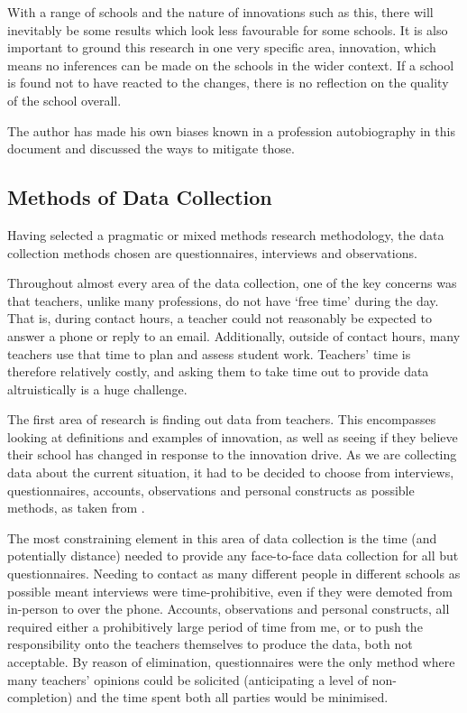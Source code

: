 \documentclass[11pt]{article}
\begin{document}
With a range of schools and the nature of innovations such as this, there will inevitably be some results which look less favourable for some schools. It is also important to ground this research in one very specific area, innovation, which means no inferences can be made on the schools in the wider context. If a school is found not to have reacted to the changes, there is no reflection on the quality of the school overall.

The author has made his own biases known in a profession autobiography in this document and discussed the ways to mitigate those.

\subsection{Methods of Data Collection}
Having selected a pragmatic or mixed methods research methodology, the data collection methods chosen are questionnaires, interviews and observations.

Throughout almost every area of the data collection, one of the key concerns was that teachers, unlike many professions, do not have `free time' during the day. That is, during contact hours, a teacher could not reasonably be expected to answer a phone or reply to an email. Additionally, outside of contact hours, many teachers use that time to plan and assess student work. Teachers' time is therefore relatively costly, and asking them to take time out to provide data altruistically is a huge challenge.

The first area of research is finding out data from teachers. This encompasses looking at definitions and examples of innovation, as well as seeing if they believe their school has changed in response to the innovation drive. As we are collecting data about the current situation, it had to be decided to choose from interviews, questionnaires, accounts, observations and personal constructs as possible methods, as taken from \citet{Cohen2005}.

The most constraining element in this area of data collection is the time (and potentially distance) needed to provide any face-to-face data collection for all but questionnaires. Needing to contact as many different people in different schools as possible meant interviews were time-prohibitive, even if they were demoted from in-person to over the phone. Accounts, observations and personal constructs, all required either a prohibitively large period of time from me, or to push the responsibility onto the teachers themselves to produce the data, both not acceptable. By reason of elimination, questionnaires were the only method where many teachers' opinions could be solicited (anticipating a level of non-completion) and the time spent both all parties would be minimised.
\end{document}
